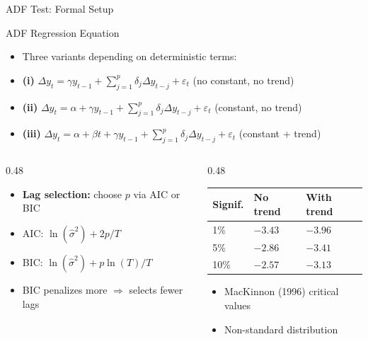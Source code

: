 \documentclass[9pt, aspectratio=169, t]{beamer}
\theoremstyle{definition}
\newenvironment{cminipage}[1]{%
    \par\noindent\hfill\begin{minipage}{#1}\ignorespaces
}{%
    \end{minipage}\hfill\null\par
}
\begin{document}
\begin{frame}{ADF Test: Formal Setup}
\begin{cminipage}{0.95\textwidth}
\small
\begin{block}{ADF Regression Equation}
\begin{itemize}\setlength{\itemsep}{0pt}
    \item Three variants depending on deterministic terms:
    \item \textbf{(i)} $\Delta y_t = \gamma y_{t-1} + \sum_{j=1}^{p}\delta_j \Delta y_{t-j} + \varepsilon_t$ \hfill (no constant, no trend)
    \item \textbf{(ii)} $\Delta y_t = \alpha + \gamma y_{t-1} + \sum_{j=1}^{p}\delta_j \Delta y_{t-j} + \varepsilon_t$ \hfill (constant, no trend)
    \item \textbf{(iii)} $\Delta y_t = \alpha + \beta t + \gamma y_{t-1} + \sum_{j=1}^{p}\delta_j \Delta y_{t-j} + \varepsilon_t$ \hfill (constant + trend)
\end{itemize}
\end{block}

\vspace{0.1cm}
\begin{columns}[T]
\begin{column}{0.48\textwidth}
\begin{itemize}\setlength{\itemsep}{0pt}
    \item \textbf{Lag selection:} choose $p$ via AIC or BIC
    \item AIC: $\ln(\hat{\sigma}^2) + 2p/T$
    \item BIC: $\ln(\hat{\sigma}^2) + p\ln(T)/T$
    \item BIC penalizes more $\Rightarrow$ selects fewer lags
\end{itemize}
\end{column}
\begin{column}{0.48\textwidth}
\footnotesize
\renewcommand{\arraystretch}{1.1}
\begin{tabular}{lll}
\toprule
\textbf{Signif.} & \textbf{No trend} & \textbf{With trend} \\
\midrule
1\% & $-3.43$ & $-3.96$ \\
5\% & $-2.86$ & $-3.41$ \\
10\% & $-2.57$ & $-3.13$ \\
\bottomrule
\end{tabular}
\begin{itemize}\setlength{\itemsep}{0pt}
    \item MacKinnon (1996) critical values
    \item Non-standard distribution
\end{itemize}
\end{column}
\end{columns}
\end{cminipage}
\end{frame}
\end{document}
